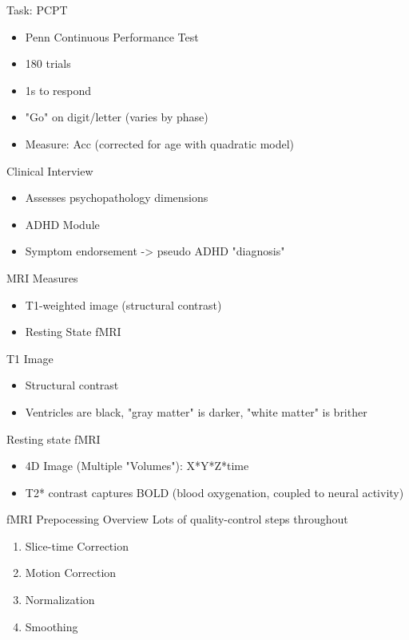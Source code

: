 \documentclass[presentation]{beamer}
\begin{document}
\begin{frame}[label={sec:orgheadline6}]{Task: PCPT}
\begin{itemize}
\item Penn Continuous Performance Test
\item 180 trials
\item 1s to respond
\item "Go" on digit/letter (varies by phase)
\item Measure: Acc (corrected for age with quadratic model)
\end{itemize}
\end{frame}
\begin{frame}[label={sec:orgheadline7}]{Clinical Interview}
\begin{itemize}
\item Assesses psychopathology dimensions
\item ADHD Module
\item Symptom endorsement -> pseudo ADHD "diagnosis"
\end{itemize}
\end{frame}
\begin{frame}[label={sec:orgheadline8}]{MRI Measures}
\begin{itemize}
\item T1-weighted image (structural contrast)
\item Resting State fMRI
\end{itemize}
\begin{block}{T1 Image}
\begin{itemize}
\item Structural contrast
\item Ventricles are black, "gray matter" is darker, "white matter" is brither
\end{itemize}
\end{block}
\begin{block}{Resting state fMRI}
\begin{itemize}
\item 4D Image (Multiple "Volumes"): X*Y*Z*time
\item T2* contrast captures BOLD (blood oxygenation, coupled to neural activity)
\end{itemize}
\end{block}
\end{frame}
\begin{frame}[label={sec:orgheadline9}]{fMRI Prepocessing Overview}
Lots of quality-control steps throughout
\begin{enumerate}
\item Slice-time Correction
\item Motion Correction
\item Normalization
\item Smoothing
\end{enumerate}
\end{frame}
\end{document}
